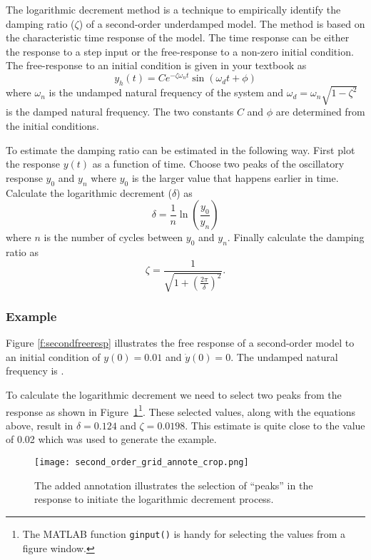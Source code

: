 The logarithmic decrement method is a technique to empirically identify the damping ratio ($\zeta$) of a second-order underdamped model.  The method is based on the characteristic time response of the model.  The time response can be either the response to a step input or the free-response to a non-zero initial condition.  The free-response to an initial condition is given in your textbook as
\begin{equation}
y_h(t)=C e^{-\zeta\omega_nt}\sin\left(\omega_dt+\phi\right) 
\end{equation}
where $\omega_n$ is the undamped natural frequency of the system and $\omega_d=\omega_n\sqrt{1-\zeta^2}$ is the damped natural frequency.  The two constants $C$ and $\phi$ are determined from the initial conditions.

To estimate the damping ratio can be estimated in the following way.  First plot the response $y(t)$ as a function of time.  Choose two peaks of the oscillatory response $y_0$ and $y_n$ where $y_0$ is the larger value that happens earlier in time.  Calculate the logarithmic decrement ($\delta$) as
\[ \delta = \frac{1}{n}\ln\left(\frac{y_0}{y_n}\right) \]
where $n$ is the number of cycles between $y_0$ and $y_n$.
Finally calculate the damping ratio as
\[ \zeta = \frac{1}{\sqrt{1+\left(\frac{2\pi}{\delta}\right)^2}}. \]

\subsubsection{Example}
Figure \ref{f:secondfreeresp} illustrates the free response of a second-order model to an initial condition of $y(0)=0.01$ and $\dot{y}(0)=0$.  The undamped natural frequency is .

To calculate the logarithmic decrement we need to select two peaks from the response as shown in Figure~\ref{f:resp2}\footnote{The MATLAB function \texttt{ginput()} is handy for selecting the values from a figure window.}. These selected values, along with the equations above, result in $\delta=0.124$ and $\zeta=0.0198$.  This estimate is quite close to the value of 0.02 which was used to generate the example.

\begin{figure}[h!bt]
\centerline{
{\texttt{[image: second\_order\_grid\_annote\_crop.png]}}}
\caption{The added annotation illustrates the selection of ``peaks'' in the response to initiate the logarithmic decrement process.}
\label{f:resp2}
\end{figure}

